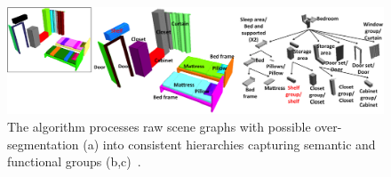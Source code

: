 
\begin{figure}[t] \centering
    \includegraphics[width=0.98\linewidth]{fig/img/liu_siga14_sh}
    \caption{
    The algorithm processes raw scene graphs with possible over-segmentation (a) into consistent hierarchies capturing semantic and functional groups (b,c)~\cite{Liu:2014:CCS}.
    }
    \label{fig:liu_siga14_sh}
\end{figure}
